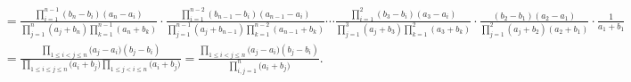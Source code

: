 \documentclass[lang=cn,newtx,10pt,scheme=chinese]{elegantbook}
\begin{document}
\begin{solution}
\begin{align*}
\\
&=\frac{\prod\limits_{i=1}^{n-1}{\left( b_n-b_i \right) \left( a_n-a_i \right)}}{\prod\limits_{j=1}^n{\left( a_j+b_n \right) \prod\limits_{k=1}^{n-1}{\left( a_n+b_k \right)}}}\cdot \frac{\prod\limits_{i=1}^{n-2}{\left( b_{n-1}-b_i \right) \left( a_{n-1}-a_i \right)}}{\prod\limits_{j=1}^{n-1}{\left( a_j+b_{n-1} \right) \prod\limits_{k=1}^{n-2}{\left( a_{n-1}+b_k \right)}}}\cdots 
 \frac{\prod\limits_{i=1}^2{\left( b_3-b_i \right) \left( a_3-a_i \right)}}{\prod\limits_{j=1}^3{\left( a_j+b_3 \right) \prod\limits_{k=1}^2{\left( a_3+b_k \right)}}}\cdot \frac{\left( b_2-b_1 \right) \left( a_2-a_1 \right)}{\prod\limits_{j=1}^2{\left( a_j+b_2 \right) \left( a_2+b_1 \right)}}\cdot \frac{1}{a_1+b_1}
\\
&=\frac{\prod\limits_{1\le i<j\le n}{(a_j}-a_i)(b_j-b_i)}{\prod\limits_{1\le i\le j\le n}{(a_i}+b_j)\prod\limits_{1\le j<i\le n}{(a_i}+b_j)}=\frac{\prod\limits_{1\le i<j\le n}{(a_j}-a_i)(b_j-b_i)}{\prod\limits_{i,j=1}^n{(a_i}+b_j)}.
    \nonumber
    \end{align*}
\end{solution}
\end{document}
